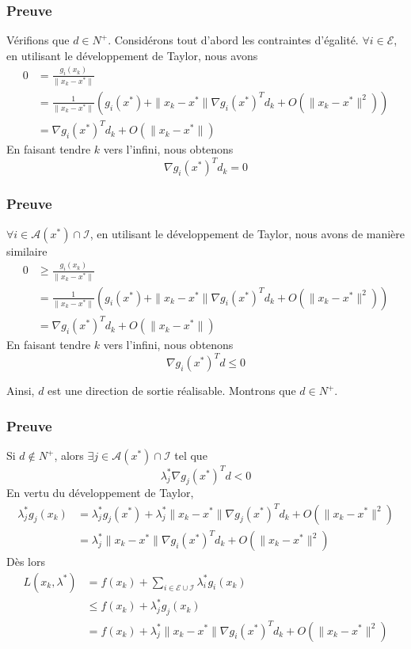 \documentclass[usepdftitle=false]{beamer}
\def\cA{\mathcal{A}}
\def\cE{\mathcal{E}}
\def\cI{\mathcal{I}}
\begin{document}
\begin{frame}
\frametitle{Preuve}

Vérifions que $d \in N^+$. Considérons tout d'abord les contraintes d'égalité.
$\forall i \in \cE$, en utilisant le développement de Taylor, nous avons
\begin{align*}
0 &= \frac{g_i(x_k)}{\| x_k - x^* \| } \\
&= \frac{1}{\| x_k - x^* \| } \left( g_i(x^*) + \| x_k - x^* \| \nabla g_i(x^*)^Td_k + O(\| x_k - x^* \|^2) \right) \\
&= \nabla g_i(x^*)^Td_k + O(\| x_k - x^* \|)
\end{align*}
En faisant tendre $k$ vers l'infini, nous obtenons
$$
\nabla g_i(x^*)^Td_k = 0
$$

\end{frame}

\begin{frame}
\frametitle{Preuve}

$\forall i \in \cA(x^*) \cap \cI$, en utilisant le développement de Taylor, nous avons de manière similaire
\begin{align*}
0 &\geq \frac{g_i(x_k)}{\| x_k - x^* \| } \\
&= \frac{1}{\| x_k - x^* \| } \left( g_i(x^*) + \| x_k - x^* \| \nabla g_i(x^*)^Td_k + O(\| x_k - x^* \|^2) \right) \\
&= \nabla g_i(x^*)^Td_k + O(\| x_k - x^* \|)
\end{align*}
En faisant tendre $k$ vers l'infini, nous obtenons
$$
\nabla g_i(x^*)^Td \leq 0
$$

\mbox{}

Ainsi, $d$ est une direction de sortie réalisable. Montrons que $d \in N^+$.

\end{frame}

\begin{frame}
\frametitle{Preuve}

Si $d \notin N^+$, alors $\exists j \in \cA(x^*) \cap \cI$ tel que
$$
\lambda_j^* \nabla g_j(x^*)^Td < 0
$$
En vertu du développement de Taylor,
\begin{align*}
\lambda_j^* g_j(x_k)
&= \lambda_j^* g_j(x^*) + \lambda_j^* \| x_k - x^* \| \nabla g_j(x^*)^Td_k + O(\| x_k - x^* \|^2) \\
&= \lambda_j^* \| x_k - x^* \|\nabla g_i(x^*)^Td_k + O(\| x_k - x^* \|^2)
\end{align*}
Dès lors
\begin{align*}
L(x_k, \lambda^*) &= f(x_k) + \sum_{i \in \cE \cup \cI} \lambda_i^* g_i(x_k) \\
&\leq f(x_k) + \lambda_j^* g_j(x_k) \\ 
&=  f(x_k) + \lambda_j^*\| x_k - x^* \|\nabla g_i(x^*)^Td_k + O(\| x_k - x^* \|^2)
\end{align*}

\end{frame}
\end{document}
